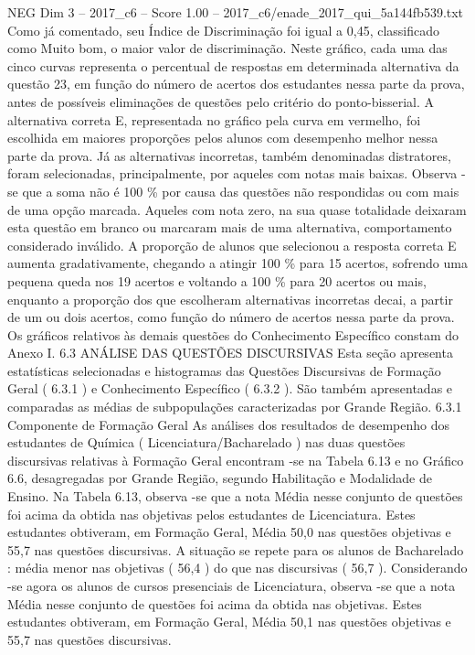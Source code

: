 \begin{textsample}{NEG Dim 3 – 2017\_c6 – Score 1.00 – 2017\_c6/enade\_2017\_qui\_5a144fb539.txt}
Como já comentado, seu Índice de Discriminação foi igual a 0,45, classificado como Muito bom, o maior valor de discriminação.
Neste gráfico, cada uma das cinco curvas representa o percentual de respostas em determinada alternativa da questão 23, em função do número de acertos dos estudantes nessa parte da prova, antes de possíveis eliminações de questões pelo critério do ponto-bisserial.
A alternativa correta E, representada no gráfico pela curva em vermelho, foi escolhida em maiores proporções pelos alunos com desempenho melhor nessa parte da prova.
Já as alternativas incorretas, também denominadas distratores, foram selecionadas, principalmente, por aqueles com notas mais baixas.
Observa -se que a soma não é 100 \% por causa das questões não respondidas ou com mais de uma opção marcada.
Aqueles com nota zero, na sua quase totalidade deixaram esta questão em branco ou marcaram mais de uma alternativa, comportamento considerado inválido.
A proporção de alunos que selecionou a resposta correta E aumenta gradativamente, chegando a atingir 100 \% para 15 acertos, sofrendo uma pequena queda nos 19 acertos e voltando a 100 \% para 20 acertos ou mais, enquanto a proporção dos que escolheram alternativas incorretas decai, a partir de um ou dois acertos, como função do número de acertos nessa parte da prova.
Os gráficos relativos às demais questões do Conhecimento Específico constam do Anexo I. 6.3 ANÁLISE DAS QUESTÕES DISCURSIVAS Esta seção apresenta estatísticas selecionadas e histogramas das Questões Discursivas de Formação Geral ( 6.3.1 ) e Conhecimento Específico ( 6.3.2 ).
São também apresentadas e comparadas as médias de subpopulações caracterizadas por Grande Região. 6.3.1 Componente de Formação Geral As análises dos resultados de desempenho dos estudantes de Química ( Licenciatura/Bacharelado ) nas duas questões discursivas relativas à Formação Geral encontram -se na Tabela 6.13 e no Gráfico 6.6, desagregadas por Grande Região, segundo Habilitação e Modalidade de Ensino.
Na Tabela 6.13, observa -se que a nota Média nesse conjunto de questões foi acima da obtida nas objetivas pelos estudantes de Licenciatura.
Estes estudantes obtiveram, em Formação Geral, Média 50,0 nas questões objetivas e 55,7 nas questões discursivas.
A situação se repete para os alunos de Bacharelado : média menor nas objetivas ( 56,4 ) do que nas discursivas ( 56,7 ).
Considerando -se agora os alunos de cursos presenciais de Licenciatura, observa -se que a nota Média nesse conjunto de questões foi acima da obtida nas objetivas.
Estes estudantes obtiveram, em Formação Geral, Média 50,1 nas questões objetivas e 55,7 nas questões discursivas.

\end{textsample}
